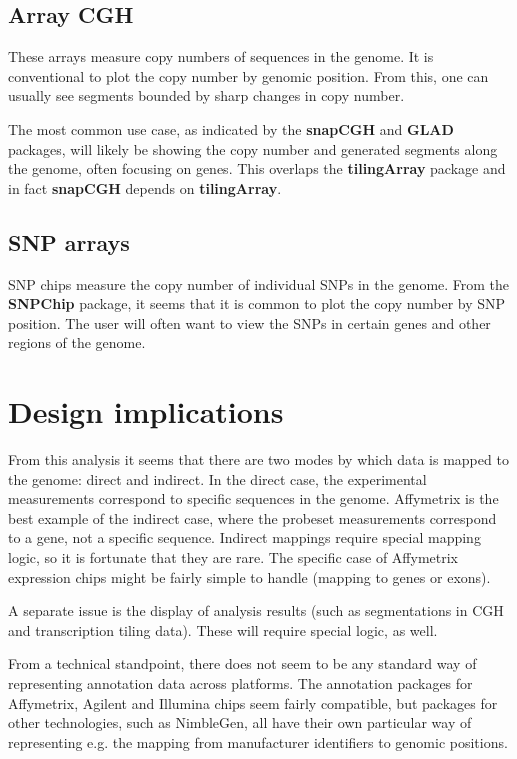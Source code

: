 \documentclass{article}
\begin{document}
\subsection{Array CGH}
\label{sec:cgh}

These arrays measure copy numbers of sequences in the genome. It is conventional to plot the copy number by genomic position. From this, one can usually see segments bounded by sharp changes in copy number.

The most common use case, as indicated by the \textbf{snapCGH} and \textbf{GLAD} packages, will likely be showing the copy number and generated segments along the genome, often focusing on genes. This overlaps the \textbf{tilingArray} package and in fact \textbf{snapCGH} depends on \textbf{tilingArray}.

\subsection{SNP arrays}
\label{sec:snp}

SNP chips measure the copy number of individual SNPs in the genome. From the \textbf{SNPChip} package, it seems that it is common to plot the copy number by SNP position. The user will often want to view the SNPs in certain genes and other regions of the genome.

\section{Design implications}

\label{sec:summary}

From this analysis it seems that there are two modes by which data is mapped to the genome: direct and indirect. In the direct case, the experimental measurements correspond to specific sequences in the genome. Affymetrix is the best example of the indirect case, where the probeset measurements correspond to a gene, not a specific sequence. Indirect mappings require special mapping logic, so it is fortunate that they are rare. The specific case of Affymetrix expression chips might be fairly simple to handle (mapping to genes or exons).

A separate issue is the display of analysis results (such as segmentations in CGH and transcription tiling data). These will require special logic, as well.

From a technical standpoint, there does not seem to be any standard way of representing annotation data across platforms. The annotation packages for Affymetrix, Agilent and Illumina chips seem fairly compatible, but packages for other technologies, such as NimbleGen, all have their own particular way of representing e.g. the mapping from manufacturer identifiers to genomic positions. 
\end{document}
